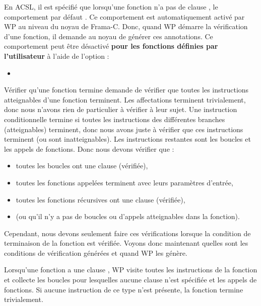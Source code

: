 \begin{Information}
  En ACSL, il est spécifié que lorsqu'une fonction n'a pas de clause
  , le comportement par défaut
  . Ce comportement est
  automatiquement activé par WP au niveau du noyau de Frama-C. Donc, quand WP
  démarre la vérification d'une fonction, il demande au noyau de générer ces
  annotations. Ce comportement peut être désactivé
  \textbf{pour les fonctions définies par l'utilisateur} à l'aide de l'option :
  \begin{itemize}
  \item {}
  \end{itemize}
\end{Information}




Vérifier qu'une fonction termine demande de vérifier que toutes les instructions
atteignables d'une fonction terminent. Les affectations terminent trivialement,
donc nous n'avons rien de particulier à vérifier à leur sujet. Une instruction
conditionnelle termine si toutes les instructions des différentes branches
(atteignables) terminent, donc nous avons juste à vérifier que ces instructions
terminent (ou sont inatteignables). Les instructions restantes sont les boucles
et les appels de fonctions. Donc nous devons vérifier que :
\begin{itemize}
  \item toutes les boucles ont une clause  (vérifiée),
  \item toutes les fonctions appelées terminent avec leurs paramètres d'entrée,
  \item toutes les fonctions récursives ont une clause  (vérifiée),
  \item (ou qu'il n'y a pas de boucles ou d'appels atteignables dans la fonction).
\end{itemize}


Cependant, nous devons seulement faire ces vérifications lorsque la condition de
terminaison de la fonction est vérifiée. Voyons donc maintenant quelles sont les
conditions de vérification générées et quand WP les génère.


Lorsqu'une fonction a une clause , WP visite toutes les
instructions de la fonction et collecte les boucles pour lesquelles aucune
clause  n'est spécifiée et les appels de fonctions. Si
aucune instruction de ce type n'est présente, la fonction termine trivialement.


